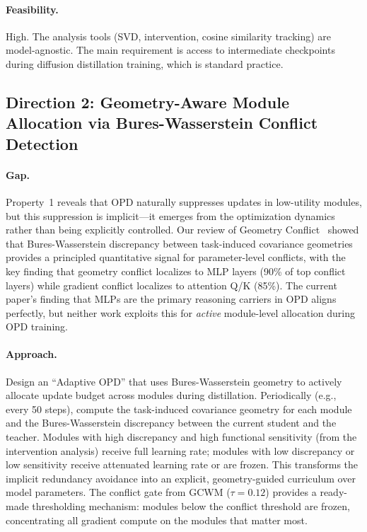 \documentclass[11pt,a4paper]{article}
\begin{document}
\paragraph{Feasibility.} High. The analysis tools (SVD, intervention, cosine similarity tracking) are model-agnostic. The main requirement is access to intermediate checkpoints during diffusion distillation training, which is standard practice.

\subsection{Direction 2: Geometry-Aware Module Allocation via Bures-Wasserstein Conflict Detection}

\paragraph{Gap.} Property~1 reveals that OPD naturally suppresses updates in low-utility modules, but this suppression is implicit---it emerges from the optimization dynamics rather than being explicitly controlled. Our review of Geometry Conflict~\cite{geometryconflict} showed that Bures-Wasserstein discrepancy between task-induced covariance geometries provides a principled quantitative signal for parameter-level conflicts, with the key finding that geometry conflict localizes to MLP layers (90\% of top conflict layers) while gradient conflict localizes to attention Q/K (85\%). The current paper's finding that MLPs are the primary reasoning carriers in OPD aligns perfectly, but neither work exploits this for \textit{active} module-level allocation during OPD training.

\paragraph{Approach.} Design an ``Adaptive OPD'' that uses Bures-Wasserstein geometry to actively allocate update budget across modules during distillation. Periodically (e.g., every 50 steps), compute the task-induced covariance geometry for each module and the Bures-Wasserstein discrepancy between the current student and the teacher. Modules with high discrepancy and high functional sensitivity (from the intervention analysis) receive full learning rate; modules with low discrepancy or low sensitivity receive attenuated learning rate or are frozen. This transforms the implicit redundancy avoidance into an explicit, geometry-guided curriculum over model parameters. The conflict gate from GCWM ($\tau{=}0.12$) provides a ready-made thresholding mechanism: modules below the conflict threshold are frozen, concentrating all gradient compute on the modules that matter most.
\end{document}
